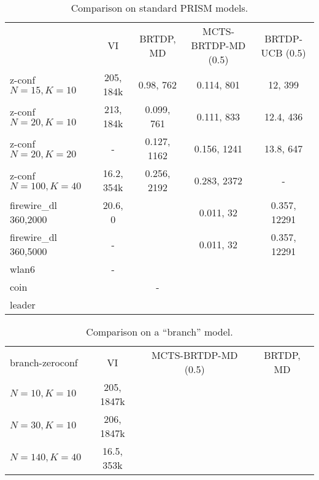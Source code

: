 \begin{landscape}

\begin{table}
\begin{tabularx}{\textwidth}{ l  | c | c | c | c }
                   & VI           &  BRTDP, MD       & MCTS-BRTDP-MD (0.5) & BRTDP-UCB (0.5)  \\
z-conf $N=15,  K=10$ & 205, 184k    &  0.98, 762       & 0.114, 801          &  12, 399         \\
z-conf $N=20,  K=10$ & 213, 184k    &  0.099, 761      & 0.111, 833          & 12.4, 436        \\
z-conf $N=20, K=20$  & -            &  0.127, 1162     & 0.156, 1241         & 13.8, 647        \\
z-conf $N=100, K=40$ & 16.2, 354k   &  0.256, 2192     & 0.283, 2372         & -                \\
firewire\_dl 360,2000 & 20.6, 0             &    & 0.011, 32        & 0.357, 12291 \\

firewire\_dl 360,5000 & -         &    & 0.011, 32        & 0.357, 12291 \\
wlan6              & -            &                  &                     & \\
coin               &              & -                &                     & \\
leader             &              &                  &                     &
\end{tabularx}
\caption{Comparison on standard PRISM models.}
\label{table:general_comparison}
\end{table}

\begin{table}
\begin{tabularx}{\textwidth}{ l  | c | c | c }
branch-zeroconf &    VI       & MCTS-BRTDP-MD (0.5) & BRTDP, MD  \\
$N=10,  K=10$     & 205, 1847k  &                     &            \\
$N=30,  K=10$     & 206, 1847k  &                     &            \\
$N=140, K=40$     & 16.5, 353k  &                     &
\end{tabularx}
\caption{Comparison on a ``branch'' model.}
\label{table:branch_zconf}
\end{table}

\end{landscape}

